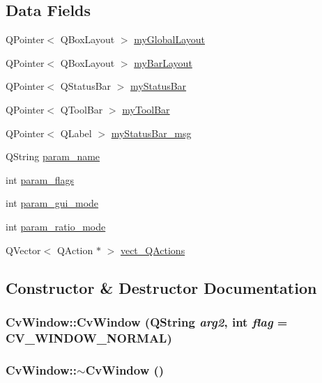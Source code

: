 \subsection*{Data Fields}
\begin{DoxyCompactItemize}
\item 
QPointer$<$ QBoxLayout $>$ \hyperlink{classCvWindow_a706d24419e22947d0fcdcef9d3194605}{myGlobalLayout}
\item 
QPointer$<$ QBoxLayout $>$ \hyperlink{classCvWindow_a1c1ba7aa00c19ca8a99da650f8bd6fb1}{myBarLayout}
\item 
QPointer$<$ QStatusBar $>$ \hyperlink{classCvWindow_ad21a9548c597a6651b73d41a3383a1d3}{myStatusBar}
\item 
QPointer$<$ QToolBar $>$ \hyperlink{classCvWindow_a147b82422fa5d532192990f77e6ae2d8}{myToolBar}
\item 
QPointer$<$ QLabel $>$ \hyperlink{classCvWindow_a62c523f9df3830591bcbb44145c85db4}{myStatusBar\_\-msg}
\item 
QString \hyperlink{classCvWindow_a2f2e2a14703dbe479049862f5f43ac13}{param\_\-name}
\item 
int \hyperlink{classCvWindow_ae79962eeb12c2dbcedafb23362ba1847}{param\_\-flags}
\item 
int \hyperlink{classCvWindow_a1503f81d43bec919c329a1c98cb3f559}{param\_\-gui\_\-mode}
\item 
int \hyperlink{classCvWindow_a9d97fe990d3fb23daa031ac39483b059}{param\_\-ratio\_\-mode}
\item 
QVector$<$ QAction $\ast$ $>$ \hyperlink{classCvWindow_a55d09660aba2ef83bf2eaa4fe80bb746}{vect\_\-QActions}
\end{DoxyCompactItemize}


\subsection{Constructor \& Destructor Documentation}
\hypertarget{classCvWindow_a2d516104e7e29c293d53a3797f29fff6}{
\subsubsection[{CvWindow}]{\setlength{\rightskip}{0pt plus 5cm}CvWindow::CvWindow (QString {\em arg2}, \/  int {\em flag} = {\ttfamily CV\_\-WINDOW\_\-NORMAL})}}
\label{classCvWindow_a2d516104e7e29c293d53a3797f29fff6}
\hypertarget{classCvWindow_aac9ea5f91071477dc506ed9a04f758f1}{
\subsubsection[{$\sim$CvWindow}]{\setlength{\rightskip}{0pt plus 5cm}CvWindow::$\sim$CvWindow ()}}
\label{classCvWindow_aac9ea5f91071477dc506ed9a04f758f1}


